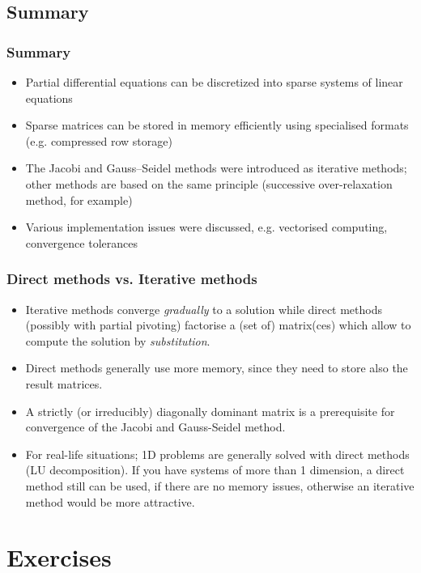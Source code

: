 \subsection*{Summary}
\begin{frame}[fragile]
  \frametitle{Summary}
  \begin{itemize}
    \item Partial differential equations can be discretized into sparse systems of linear equations
    \item Sparse matrices can be stored in memory efficiently using specialised formats (e.g. compressed row storage)
    \item The Jacobi and Gauss–Seidel methods were introduced as iterative methods; other methods are based on the same principle (successive over-relaxation method, for example)
    \item Various implementation issues were discussed, e.g. vectorised computing, convergence tolerances
  \end{itemize}
\end{frame}

\begin{frame}[fragile]
  \frametitle{Direct methods vs. Iterative methods}
  \begin{itemize}
    \item Iterative methods converge \emph{gradually} to a solution while direct methods (possibly with partial pivoting) factorise a (set of) matrix(ces) which allow to compute the solution by \emph{substitution}.
    \item Direct methods generally use more memory, since they need to store also the result matrices.
    \item A strictly (or irreducibly) diagonally dominant matrix is a prerequisite for convergence of the Jacobi and Gauss-Seidel method.
    \item For real-life situations; 1D problems are generally solved with direct methods (LU decomposition). If you have systems of more than 1 dimension, a direct method still can be used, if there are no memory issues, otherwise an iterative method would be more attractive.
  \end{itemize}
\end{frame}

\section{Exercises}
